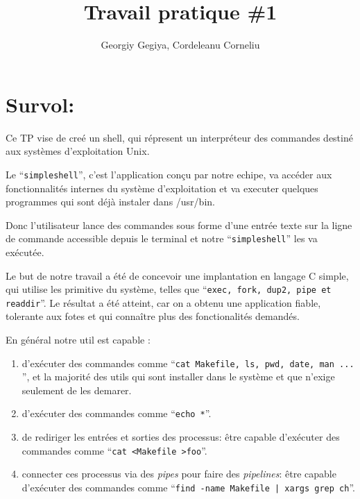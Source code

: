 \documentclass{article}
\title{Travail pratique \#1}
\author{Georgiy Gegiya, Cordeleanu Corneliu}
\begin{document}
\maketitle

\newcommand \mML {\ensuremath\mu\textsl{ML}}
\newcommand \kw [1] {\textsf{#1}}
\newcommand \id [1] {\textsl{#1}}
\newcommand \punc [1] {\kw{`#1'}}
\newcommand \str [1] {\texttt{"#1"}}
\newenvironment{outitemize}{
  \begin{itemize}
  \let \origitem \item \def \item {\origitem[]\hspace{-18pt}}
}{
  \end{itemize}
}
\newcommand \Align [2][t] {
  \begin{array}[#1]{@{}l}
    #2
  \end{array}}

\section{Survol:}
Ce TP vise de creé un shell, qui répresent un interpréteur des commandes destiné
aux systèmes d'exploitation Unix. 

Le ``\texttt{simpleshell}'', c'est l'application conçu par notre echipe, 
va accéder aux fonctionnalités internes du système d'exploitation
et va executer quelques programmes qui sont déjà instaler dans /usr/bin. 

Donc l'utilisateur lance des commandes sous forme d'une entrée texte sur 
la ligne de commande accessible depuis le terminal et notre ``\texttt{simpleshell}''
les va exécutée. 

Le but de notre travail a été de concevoir une implantation en langage C simple, qui
utilise les primitive du système, telles que ``\texttt{exec, fork, dup2, pipe et readdir}''.
Le résultat a été atteint, car on a obtenu une application fiable, tolerante aux fotes et
qui connaître plus des fonctionalités demandés.

En général notre util est capable :
\begin{enumerate}
\item d'exécuter des commandes comme ``\texttt{cat Makefile, ls, pwd, date, man ... }'', 
et la majorité des utils qui sont installer dans le système et que n'exige seulement de 
les demarer.
\item d'exécuter des commandes comme ``\texttt{echo *}''.
\item de rediriger les entrées et sorties des processus: être capable
d'exécuter des commandes comme ``\texttt{cat <Makefile >foo}''.
\item connecter ces processus via des \emph{pipes} pour faire des \emph{pipelines}:
être capable d'exécuter des commandes comme ``\texttt{find -name Makefile | xargs grep ch}''.
\end{enumerate}  
\end{document}
